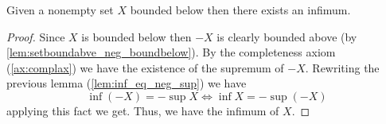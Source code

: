 \begin{lemma}\label{lem:existsinfimum}
  Given a nonempty set $X$ bounded below then there exists an infimum.
\end{lemma}
\begin{proof}
  Since $X$ is bounded below then $-X$ is clearly bounded above
  (by \autoref{lem:setboundabve_neg_boundbelow}).
  By the completeness axiom
  (\autoref{ax:complax})
  we have the existence of the supremum of $-X$.
  Rewriting the previous lemma
  (\autoref{lem:inf_eq_neg_sup})
  we have
  \[
  \inf(-X) = -\sup{X} \iff \inf{X} = -\sup(-X)
  \]
  applying this fact we get.
  Thus,
  we have the infimum of $X$.
\end{proof}